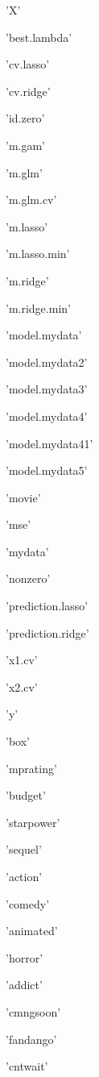 \documentclass[11pt]{article}
\begin{document}
    \begin{enumerate*}
\item 'X'
\item 'best.lambda'
\item 'cv.lasso'
\item 'cv.ridge'
\item 'id.zero'
\item 'm.gam'
\item 'm.glm'
\item 'm.glm.cv'
\item 'm.lasso'
\item 'm.lasso.min'
\item 'm.ridge'
\item 'm.ridge.min'
\item 'model.mydata'
\item 'model.mydata2'
\item 'model.mydata3'
\item 'model.mydata4'
\item 'model.mydata41'
\item 'model.mydata5'
\item 'movie'
\item 'mse'
\item 'mydata'
\item 'nonzero'
\item 'prediction.lasso'
\item 'prediction.ridge'
\item 'x1.cv'
\item 'x2.cv'
\item 'y'
\end{enumerate*}


    
    \begin{enumerate*}
\item 'box'
\item 'mprating'
\item 'budget'
\item 'starpower'
\item 'sequel'
\item 'action'
\item 'comedy'
\item 'animated'
\item 'horror'
\item 'addict'
\item 'cmngsoon'
\item 'fandango'
\item 'cntwait'
\end{enumerate*}
\end{document}
